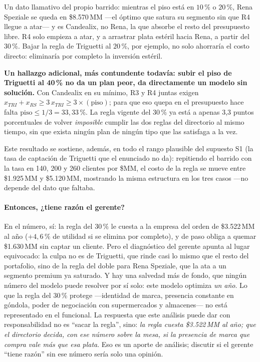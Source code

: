 \documentclass[10pt,a4paper]{article}
\begin{document}
Un dato llamativo del propio barrido: mientras el piso está en $10\,\%$ o
$20\,\%$, Rena Speziale se queda en \$8.570\,MM —el óptimo que satura su
segmento sin que R4 llegue a atar— y es Candealix, no Rena, la que absorbe el
resto del presupuesto libre. R4 solo empieza a atar, y a arrastrar plata
estéril hacia Rena, a partir del $30\,\%$. Bajar la regla de Triguetti al
$20\,\%$, por ejemplo, no solo ahorraría el costo directo: eliminaría por
completo la inversión estéril.

\textbf{Un hallazgo adicional, más contundente todavía: subir el piso de
Triguetti al 40\,\% no da un plan peor, da directamente un modelo sin
solución.} Con Candealix en su mínimo, R3 y R4 juntas exigen
$x_{TRI}+x_{RS}\geq 3\,x_{TRI}\geq 3\times(\text{piso})$; para que eso quepa
en el presupuesto hace falta $\text{piso}\leq 1/3=33{,}33\,\%$. La regla
vigente del $30\,\%$ ya está a apenas 3,3 puntos porcentuales de volver
\emph{imposible} cumplir las dos reglas del directorio al mismo tiempo, sin
que exista ningún plan de ningún tipo que las satisfaga a la vez.

Este resultado se sostiene, además, en todo el rango plausible del supuesto
S1 (la tasa de captación de Triguetti que el enunciado no da): repitiendo el
barrido con la tasa en 140, 200 y 260 clientes por \$MM, el costo de la regla
se mueve entre \$1.925\,MM y \$5.120\,MM, mostrando la misma estructura en
los tres casos —no depende del dato que faltaba.

\paragraph{Entonces, ¿tiene razón el gerente?} En el número, sí: la regla del
$30\,\%$ le cuesta a la empresa del orden de \$3.522\,MM al año
($+4{,}6\,\%$ de utilidad si se elimina por completo), y de paso obliga a
quemar \$1.630\,MM sin captar un cliente. Pero el diagnóstico del gerente
apunta al lugar equivocado: la culpa no es de Triguetti, que rinde casi lo
mismo que el resto del portafolio, sino de la regla del doble para Rena
Speziale, que la ata a un segmento premium ya saturado. Y hay una salvedad
más de fondo, que ningún número del modelo puede resolver por sí solo: este
modelo optimiza \emph{un año}. Lo que la regla del 30\,\% protege —identidad
de marca, presencia constante en góndola, poder de negociación con
supermercados y almacenes— no está representado en el funcional. La
respuesta que este análisis puede dar con responsabilidad no es ``sacar la
regla'', sino: \emph{la regla cuesta \$3.522\,MM al año; que el directorio
decida, con ese número sobre la mesa, si la presencia de marca que compra vale
más que esa plata}. Eso es un aporte de análisis; discutir si el gerente
``tiene razón'' sin ese número sería solo una opinión.
\end{document}
